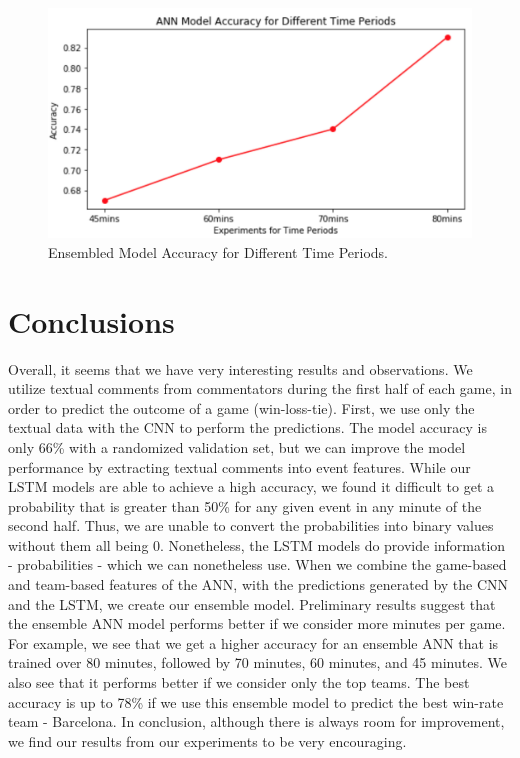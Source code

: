 \documentclass[11pt,a4paper]{article}
\begin{document}
\begin{figure}
\includegraphics[width=\columnwidth]{./img/fig-3.png}
\caption{\label{min-acc-figure} Ensembled Model Accuracy for Different Time Periods.}
\end{figure}


\section{Conclusions}

Overall, it seems that we have very interesting results and observations. We utilize textual comments from commentators during the first half of each game, in order to predict the outcome of a game (win-loss-tie). First, we use only the textual data with the CNN to perform the predictions. The model accuracy is only 66\% with a randomized validation set, but we can improve the model performance by extracting textual comments into event features. While our LSTM models are able to achieve a high accuracy, we found it difficult to get a probability that is greater than 50\% for any given event in any minute of the second half. Thus, we are unable to convert the probabilities into binary values without them all being 0. Nonetheless, the LSTM models do provide information - probabilities - which we can nonetheless use. When we combine the game-based and team-based features of the ANN, with the predictions generated by the CNN and the LSTM, we create our ensemble model. Preliminary results suggest that the ensemble ANN model performs better if we consider more minutes per game. For example, we see that we get a higher accuracy for an ensemble ANN that is trained over 80 minutes, followed by 70 minutes, 60 minutes, and 45 minutes. We also see that it performs better if we consider only the top teams. The best accuracy is up to 78\% if we use this ensemble model to predict the best win-rate team - Barcelona. In conclusion, although there is always room for improvement, we find our results from our experiments to be very encouraging.  



\end{document}
